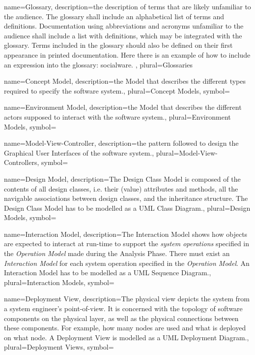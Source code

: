 {name={Glossary},
description={the description of terms that are
likely unfamiliar to the audience. The glossary shall include an alphabetical list of
terms and definitions. Documentation using abbreviations and acronyms unfamiliar
to the audience shall include a list with definitions, which may be integrated
with the glossary. Terms included in the glossary should also be defined on
their first appearance in printed documentation. Here there is an example of how
to include an expression into the glossary: \gls{socialware}. 
}, 
plural={Glossaries}
}



{name={Concept Model},
description={the Model that describes the different types required to specify
the software system.}, 
plural={Concept Models},
symbol={}
}

{name={Environment Model},
description={the Model that describes the different actors supposed to interact
with the software system.}, 
plural={Environment Models},
symbol={}
}

{name={Model-View-Controller},
description={the pattern followed to design the Graphical User Interfaces
of the software system.}, 
plural={Model-View-Controllers}, 
symbol={}
}


{name={Design Model},
description={The Design Class Model is composed of the contents of all design classes, i.e.
their (value) attributes and methods, all the navigable associations between
design classes, and the inheritance structure. The Design Class Model has to be
modelled as a UML Class Diagram.}, 
plural={Design Models}, 
symbol={}
}


{name={Interaction Model},
description={The Interaction Model shows how objects are expected to interact at run-time to
support the \emph{system operations} specified in the \emph{Operation Model}
made during the Analysis Phase. There must exist an \emph{Interaction Model} for
each system operation specified in the \emph{Operation Model}. An Interaction Model has to be
modelled as a UML Sequence Diagram.}, 
plural={Interaction Models}, 
symbol={}
}

{name={Deployment View},
description={The physical view depicts the system from a system engineer's
point-of-view. It is concerned with the topology of software components on the
physical layer, as well as the physical connections between these components.
For example, how many nodes are used and what is deployed on what node. A
Deployment View is modelled as a UML Deployment Diagram.}, 
plural={Deployment Views}, 
symbol={}
}


